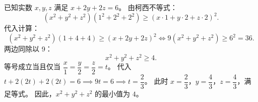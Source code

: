 \begin{answer}
已知实数 $x, y, z$ 满足 $x + 2y + 2z = 6$。
由柯西不等式：
\nopagebreak[4]
\[(x^2 + y^2 + z^2)\left(1^2 + 2^2 + 2^2\right) \geqslant (x \cdot 1 + y \cdot 2 + z \cdot 2)^2.\]
代入计算：
\nopagebreak[4]
\[(x^2 + y^2 + z^2)(1 + 4 + 4) \geqslant (x + 2y + 2z)^2 \iff 9(x^2 + y^2 + z^2) \geqslant 6^2 = 36.\]
两边同除以 9：
\nopagebreak[4]
\[x^2 + y^2 + z^2 \geqslant 4.\]
等号成立当且仅当 $\dfrac{x}{1} = \dfrac{y}{2} = \dfrac{z}{2} = t$。
代入 $t + 2(2t) + 2(2t) = 6 \implies 9t = 6 \implies t = \dfrac{2}{3}$。
此时 $x = \dfrac{2}{3}$，$y = \dfrac{4}{3}$，$z = \dfrac{4}{3}$，满足等式。
因此，$x^2 + y^2 + z^2$ 的最小值为 $4$。


\end{answer}

